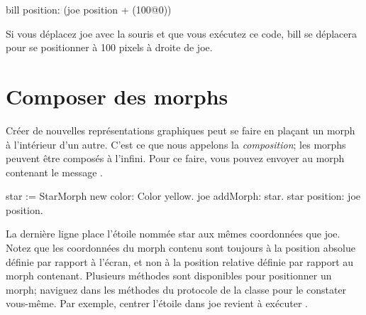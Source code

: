 \documentclass[a4paper,10pt,twoside]{book}
\begin{document}
\begin{code}{}
bill position: (joe position + (100@0))
\end{code}
\noindent

Si vous déplacez joe avec la souris et que vous exécutez ce code,
bill se déplacera pour se positionner \`a 100 pixels \`a droite de joe.

\section{Composer des morphs}

Créer de nouvelles représentations graphiques peut se faire en
plaçant un morph \`a l'intérieur d'un autre. C'est ce que nous
appelons la \emph{composition}; les morphs peuvent être composés
\`a l'infini. %
Pour ce faire, vous pouvez envoyer au morph contenant le message
. %
%

\begin{code}{}
star := StarMorph new color: Color yellow.
joe addMorph: star.
star position: joe position.
\end{code}

\noindent
La dernière ligne place l'étoile nommée star aux mêmes
coordonnées que joe. Notez que les coordonnées du morph
contenu sont toujours \`a la position absolue définie par rapport
\`a l'écran, et non \`a la position relative définie par rapport
au morph contenant.
Plusieurs méthodes sont disponibles pour positionner un morph;
naviguez dans les méthodes du protocole  de la
classe  pour le constater vous-même.
Par exemple, centrer l'étoile dans joe revient \`a exécuter
  .
\end{document}
